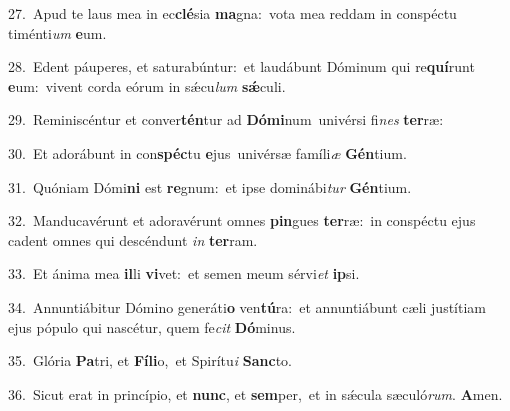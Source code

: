 {\numbfont\textcolor{\numbcolor}{27.}}~Apud te laus mea in ec\-\textbf{clé}\-sia \textbf{ma}\-gna:~\star vota mea reddam in conspéctu timénti\textit{um} \textbf{e}\-um.\par
{\numbfont\textcolor{\numbcolor}{28.}}~Edent páuperes, et saturabúntur:~\dagger et laudábunt Dóminum qui re\-\textbf{quí}\-runt \textbf{e}\-um:~\star vivent corda eórum in sǽcu\textit{lum} \textbf{sǽ}\-culi.\par
{\numbfont\textcolor{\numbcolor}{29.}}~Reminiscéntur et conver\-\textbf{tén}\-tur ad \textbf{Dó}\-\textbf{mi}num~\star univérsi fi\textit{nes} \textbf{ter}\-ræ:\par
{\numbfont\textcolor{\numbcolor}{30.}}~Et adorábunt in con\-\textbf{spéc}\-tu \textbf{e}\-jus~\star univérsæ famíli\textit{æ} \textbf{Gén}\-tium.\par
{\numbfont\textcolor{\numbcolor}{31.}}~Quóniam Dómi\textbf{ni} est \textbf{re}\-gnum:~\star et ipse dominábi\textit{tur} \textbf{Gén}\-tium.\par
{\numbfont\textcolor{\numbcolor}{32.}}~Manducavérunt et adoravérunt omnes \textbf{pin}\-gues \textbf{ter}\-ræ:~\star in conspéctu ejus cadent omnes qui descéndunt \textit{in} \textbf{ter}\-ram.\par
{\numbfont\textcolor{\numbcolor}{33.}}~Et ánima mea \textbf{il}\-li \textbf{vi}\-vet:~\star et semen meum sérvi\textit{et} \textbf{ip}\-si.\par
{\numbfont\textcolor{\numbcolor}{34.}}~Annuntiábitur Dómino generáti\textbf{o} ven\-\textbf{tú}\-ra:~\star et annuntiábunt cæli justítiam ejus pópulo qui nascétur, quem fe\textit{cit} \textbf{Dó}\-minus.\par
{\numbfont\textcolor{\numbcolor}{35.}}~Glória \textbf{Pa}\-tri, et \textbf{Fí}\-\textbf{li}o,~\star et Spirítu\textit{i} \textbf{Sanc}\-to.\par
{\numbfont\textcolor{\numbcolor}{36.}}~Sicut erat in princípio, et \textbf{nunc}\-, et \textbf{sem}\-per,~\star et in sǽcula sæculó\-\textit{rum}\-. \textbf{A}\-men.\par
